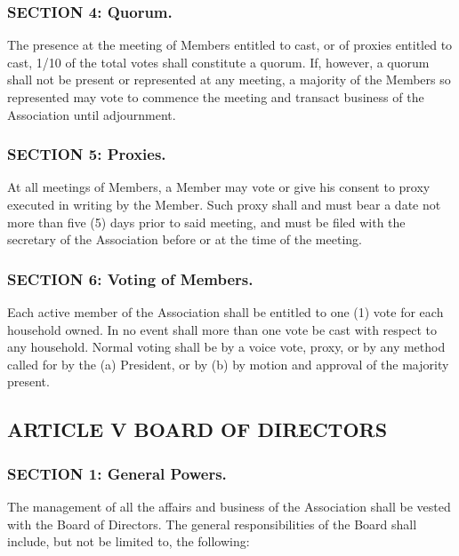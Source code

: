 \subsubsection{SECTION 4: Quorum.}
The presence at the meeting of Members entitled to cast, or of proxies
entitled to cast, 1/10 of the total votes shall constitute a quorum. If,
however, a quorum shall not be present or represented at any meeting,
a majority of the Members so represented may vote to commence the meeting
and transact business of the Association until adjournment.

\subsubsection{SECTION 5: Proxies.}
At all meetings of Members, a Member may vote or give his consent to proxy
executed in writing by the Member. Such proxy shall and must bear a date
not more than five (5) days prior to said meeting, and must be filed with
the secretary of the Association before or at the time of the meeting.

\subsubsection{SECTION 6: Voting of Members.}
Each active member of the Association shall be entitled to one (1) vote
for each household owned. In no event shall more than one vote be cast
with respect to any household. Normal voting shall be by a voice vote,
proxy, or by any method called for by the (a) President, or by (b)
by motion and approval of the majority present.

\subsection{ARTICLE V BOARD OF DIRECTORS}

\subsubsection{SECTION 1: General Powers.}
The management of all the affairs and business of the Association shall
be vested with the Board of Directors. The general responsibilities of
the Board shall include, but not be limited to, the following:

